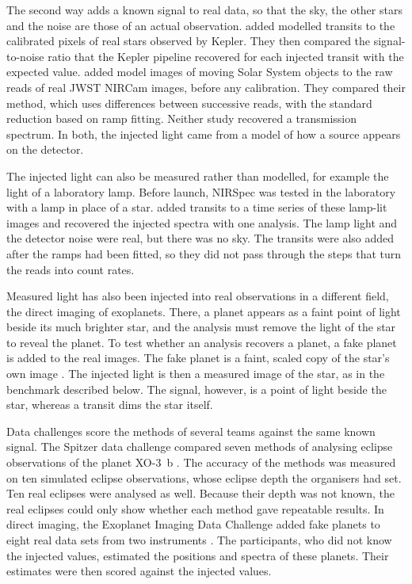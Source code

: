The second way adds a known signal to real data, so that the sky, the other
stars and the noise are those of an actual observation.
\citet{ChristiansenEtAl2013} added modelled transits to the calibrated pixels
of real stars observed by Kepler. They then compared the signal-to-noise ratio
that the Kepler pipeline recovered for each injected transit with the expected
value. \citet{GirmeniaMetchev2026} added model images of moving Solar System
objects to the raw reads of real JWST NIRCam images, before any calibration.
They compared their method, which uses differences between successive reads, with the standard reduction based on ramp fitting. Neither study recovered a transmission spectrum. In both, the injected
light came from a model of how a source appears on the detector.

The injected light can also be measured rather than modelled, for example the
light of a laboratory lamp. Before launch, NIRSpec was tested in the
laboratory with a lamp in place of a star. \citet{RustamkulovEtAl2022} added
transits to a time series of these lamp-lit images and recovered the injected
spectra with one analysis. The lamp light and the detector noise were real,
but there was no sky. The transits were also added after the ramps had been
fitted, so they did not pass through the steps that turn the reads into count
rates.

Measured light has also been injected into real observations in a
different field, the direct imaging of exoplanets. There, a planet appears as
a faint point of light beside its much brighter star, and the analysis must
remove the light of the star to reveal the planet. To test whether an
analysis recovers a planet, a fake planet is added to the real images. The
fake planet is a faint, scaled copy of the star's own image
\citep{LafreniereEtAl2007}. The injected light is then a measured image of the
star, as in the benchmark described below. The signal, however, is a point of
light beside the star, whereas a transit dims the star itself.

Data challenges score the methods of several teams against the same known signal. The Spitzer data challenge compared seven
methods of analysing eclipse observations of the planet XO-3~b
\citep{IngallsEtAl2016}. The accuracy of the methods was measured on ten
simulated eclipse observations, whose eclipse depth the organisers had set.
Ten real eclipses were analysed as well. Because their depth was not known,
the real eclipses could only show whether each method gave repeatable
results. In direct imaging, the Exoplanet Imaging Data Challenge added fake
planets to eight real data sets from two instruments
\citep{CantalloubeEtAl2024}. The participants, who did not know the injected
values, estimated the positions and spectra of these planets. Their estimates
were then scored against the injected values.

